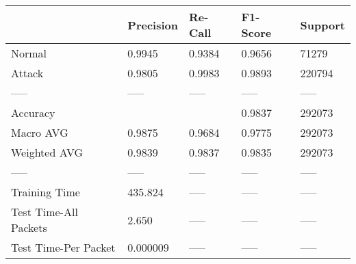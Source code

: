 \begin{tabular}{lllll}
\toprule
{} & Precision & Re-Call & F1-Score & Support \\
\midrule
Normal                &    0.9945 &  0.9384 &   0.9656 &   71279 \\
Attack                &    0.9805 &  0.9983 &   0.9893 &  220794 \\
-----                 &     ----- &   ----- &    ----- &   ----- \\
Accuracy              &           &         &   0.9837 &  292073 \\
Macro AVG             &    0.9875 &  0.9684 &   0.9775 &  292073 \\
Weighted AVG          &    0.9839 &  0.9837 &   0.9835 &  292073 \\
-----                 &     ----- &   ----- &    ----- &   ----- \\
Training Time         &   435.824 &   ----- &    ----- &   ----- \\
Test Time-All Packets &     2.650 &   ----- &    ----- &   ----- \\
Test Time-Per Packet  &  0.000009 &   ----- &    ----- &   ----- \\
\bottomrule
\end{tabular}
